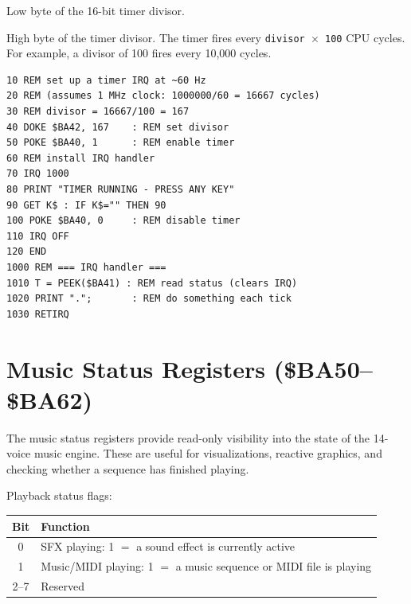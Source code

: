 Low byte of the 16-bit timer divisor.


High byte of the timer divisor.  The timer fires every
\texttt{divisor $\times$ 100} CPU cycles.  For example, a divisor of 100
fires every 10,000 cycles.

\begin{lstlisting}
10 REM set up a timer IRQ at ~60 Hz
20 REM (assumes 1 MHz clock: 1000000/60 = 16667 cycles)
30 REM divisor = 16667/100 = 167
40 DOKE $BA42, 167    : REM set divisor
50 POKE $BA40, 1      : REM enable timer
60 REM install IRQ handler
70 IRQ 1000
80 PRINT "TIMER RUNNING - PRESS ANY KEY"
90 GET K$ : IF K$="" THEN 90
100 POKE $BA40, 0     : REM disable timer
110 IRQ OFF
120 END
1000 REM === IRQ handler ===
1010 T = PEEK($BA41) : REM read status (clears IRQ)
1020 PRINT ".";       : REM do something each tick
1030 RETIRQ
\end{lstlisting}


\section{Music Status Registers (\$BA50--\$BA62)}
\label{sec:music-status}

The music status registers provide read-only visibility into the state of
the 14-voice music engine.  These are useful for visualizations, reactive
graphics, and checking whether a sequence has finished playing.



Playback status flags:


\begin{center}
\small
\begin{tabular}{@{}cl@{}}
\toprule
\textbf{Bit} & \textbf{Function} \\
\midrule
0 & SFX playing: 1 $=$ a sound effect is currently active \\
1 & Music/MIDI playing: 1 $=$ a music sequence or MIDI file is playing \\
2--7 & Reserved \\
\bottomrule
\end{tabular}
\end{center}

